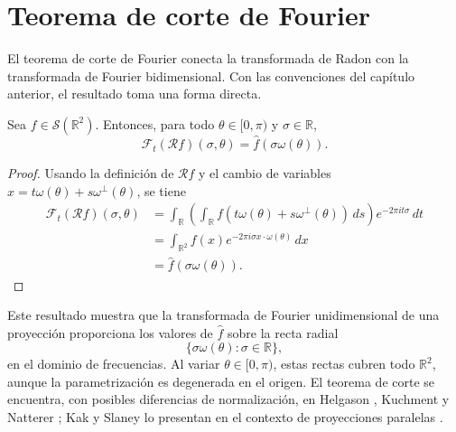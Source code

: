 \section{Teorema de corte de Fourier}

El teorema de corte de Fourier conecta la transformada de Radon con la transformada de Fourier bidimensional. Con las convenciones del capítulo anterior, el resultado toma una forma directa.

\begin{theorem}
Sea $f\in\mathcal S(\mathbb R^2)$. Entonces, para todo $\theta\in[0,\pi)$ y $\sigma\in\mathbb R$,
\[
\mathcal F_t(\mathcal Rf)(\sigma,\theta)
=
\widehat f(\sigma\omega(\theta)).
\]
\end{theorem}

\begin{proof}
Usando la definición de $\mathcal Rf$ y el cambio de variables $x=t\omega(\theta)+s\omega^\perp(\theta)$, se tiene
\[
\begin{aligned}
\mathcal F_t(\mathcal Rf)(\sigma,\theta)
&=
\int_{\mathbb R}
\left(
\int_{\mathbb R}
f(t\omega(\theta)+s\omega^\perp(\theta))\,ds
\right)
e^{-2\pi i t\sigma}\,dt \\
&=
\int_{\mathbb R^2}
f(x)e^{-2\pi i\sigma x\cdot\omega(\theta)}\,dx \\
&=
\widehat f(\sigma\omega(\theta)).
\end{aligned}
\]
\end{proof}

Este resultado muestra que la transformada de Fourier unidimensional de una proyección proporciona los valores de $\widehat f$ sobre la recta radial
\[
\{\sigma\omega(\theta):\sigma\in\mathbb R\},
\]
en el dominio de frecuencias. Al variar $\theta\in[0,\pi)$, estas rectas cubren todo $\mathbb R^2$, aunque la parametrización es degenerada en el origen. El teorema de corte se encuentra, con posibles diferencias de normalización, en Helgason \cite{helgason1999}, Kuchment \cite[Sec.~5.5.4, Thm.~5.10, pp.~32--33]{kuchment2014} y Natterer \cite[Sec.~II.1, Thm.~1.1, p.~11]{natterer2001}; Kak y Slaney lo presentan en el contexto de proyecciones paralelas \cite[Sec.~3.2]{kak_slaney1988}.
